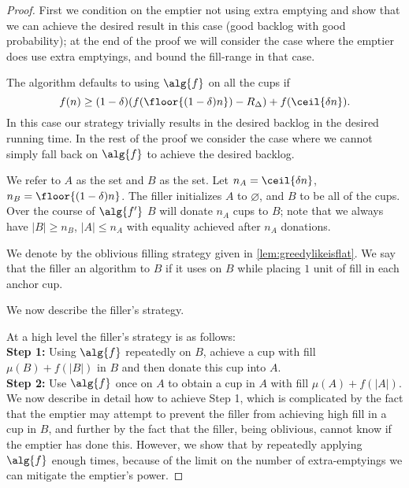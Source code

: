 \begin{proof}
  First we condition on the emptier not using extra emptying
  and show that we can achieve the desired result in this case
  (good backlog with good probability);
  at the end of the proof we will consider the case where the
  emptier does use extra emptyings, and bound the fill-range in
  that case. 

  The algorithm defaults to using $\alg{f}$ on all the cups if 
  $$f(n) \ge (1-\delta) (f(\floor{(1-\delta)n})-R_\Delta) +
  f(\ceil{\delta n}).$$
  In this case our strategy trivially results in the desired
  backlog in the desired running time. In the rest of the proof we
  consider the case where we cannot simply fall back on $\alg{f}$
  to achieve the desired backlog.

  We refer to $A$ as the  set and $B$ as the
   set. Let $n_A = \ceil{\delta n}$, $n_B =
  \floor{(1-\delta)n}$. The filler initializes $A$ to
  $\varnothing$, and $B$ to be all of the cups. Over the course
  of $\alg{f'}$ $B$ will donate $n_A$ cups to $B$; note that 
  we always have $|B| \ge n_B$, $|A| \le n_A$ with equality
  achieved after $n_A$ donations.

  We denote by \flatalg the oblivious filling strategy given in
  \cref{lem:greedylikeisflat}. We say that the filler
   an algorithm \genericalg to $B$ if it uses
  \genericalg on $B$ while placing $1$ unit of fill in each
  anchor cup.

  We now describe the filler's strategy.

  At a high level the filler's strategy is as follows:\\
  \textbf{Step 1:} Using $\alg{f}$ repeatedly on $B$, achieve a
  cup with fill $\mu(B) + f(|B|)$ in $B$ and then donate this cup into $A$. \\
  \textbf{Step 2:} Use $\alg{f}$ once on $A$ to obtain a cup in
  $A$ with fill $\mu(A) + f(|A|)$.\\

  We now describe in detail how to achieve Step 1, which is
  complicated by the fact that the emptier may attempt to prevent
  the filler from achieving high fill in a cup in $B$, and
  further by the fact that the filler, being oblivious, cannot
  know if the emptier has done this. However, we show that by
  repeatedly applying $\alg{f}$ enough times, because of the
  limit on the number of extra-emptyings we can mitigate the
  emptier's power.


\end{proof}
